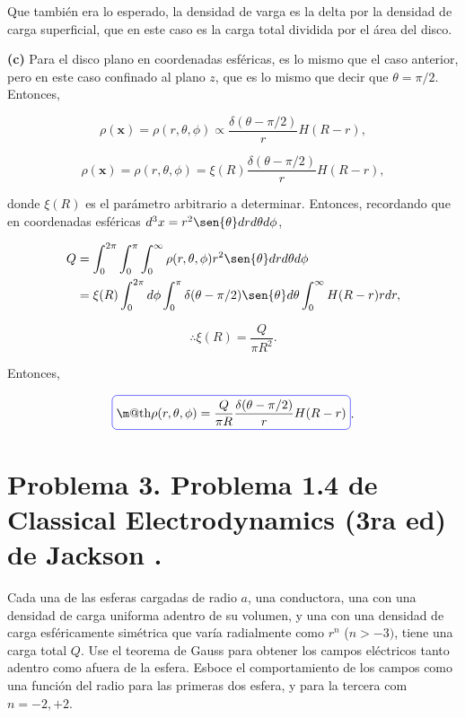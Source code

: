 \documentclass[a4paper,10pt]{article}
\makeatletter
\numberwithin{equation}{section}
\newcommand*{\boxcolor}{blue}
\renewcommand{\boxed}[1]{\textcolor{\boxcolor}{%
\tikz[baseline={([yshift=-1ex]current bounding box.center)}] \node [rectangle, minimum width=1ex,rounded corners,draw] {\normalcolor\m@th$\displaystyle#1$};}}
\makeatother
\begin{document}
Que también era lo esperado, la densidad de varga es la delta por la densidad de 
carga superficial, que en este caso es la carga total dividida por el área del 
disco.

\vspace{.3cm}

\textbf{(c)} Para el disco plano en coordenadas esféricas, es lo mismo que el caso 
anterior, pero en este caso confinado al plano $z$, que es lo mismo que decir que 
$\theta = \pi/2$. Entonces, 

\begin{equation}
 \rho(\mathbf{x}) =  \rho(r,\theta,\phi) \propto 
 \frac{\delta(\theta - \pi/2)}{r}H(R-r),
\end{equation}

\begin{equation}
 \rho(\mathbf{x}) =  \rho(r,\theta,\phi)  = 
 \xi(R)\frac{\delta(\theta - \pi/2)}{r}H(R-r),
\end{equation}

donde $\xi(R)$ es el parámetro arbitrario a determinar. Entonces, recordando que 
en coordenadas esféricas $d^3x = r^2\sen{\theta}dr d\theta d\phi$,

\begin{align*}
 Q &= \int_0^{2\pi} \int_0^\pi \int_0^\infty 
  \rho(r,\theta,\phi) r^2\sen{\theta}dr d\theta d\phi \\
  &=   \xi(R)\int_0^{2\pi}d\phi \int_0^\pi \delta(\theta - \pi/2)\sen{\theta}d\theta 
  \int_0^\infty H(R-r)rdr,
\end{align*}

\begin{equation}
 \therefore \xi(R) = \frac{Q}{\pi R^2}.
\end{equation}

Entonces,

\begin{equation}
 \boxed{\rho(r,\theta,\phi) = \frac{Q}{\pi R}\frac{\delta(\theta - \pi/2)}{r}H(R-r)}.
\end{equation}

\section{Problema 3. Problema 1.4 de Classical Electrodynamics (3ra ed) de 
Jackson \cite{jackson}.}

Cada una de las esferas cargadas de radio $a$, una conductora, una con una densidad 
de carga uniforma adentro de su volumen, y una con una densidad de carga esféricamente 
simétrica que varía radialmente como $r^n$ ($n > -3)$, tiene una carga total $Q$. 
Use el teorema de Gauss para obtener los campos eléctricos tanto adentro como afuera 
de la esfera. Esboce el comportamiento de los campos como una función del radio 
para las primeras dos esfera, y para la tercera com $n= -2,+2$. 
\end{document}
